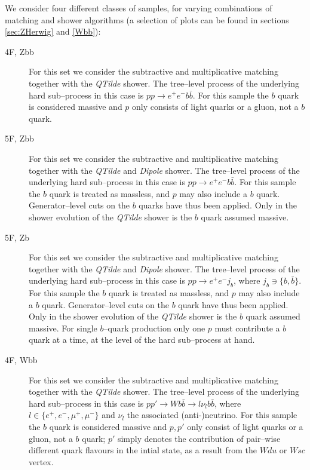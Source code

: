 \documentclass[11pt]{cernrep}
\begin{document}
We consider four different classes of samples, for varying combinations of
matching and shower algorithms (a selection of plots can be found in sections
\ref{sec:ZHerwig} and \ref{Wbb}):
\begin{description}
\item[4F, Zbb] For this set we consider the subtractive and multiplicative
  matching together with the \textit{QTilde} shower. The tree--level process of
  the underlying hard sub--process in this case is
  $pp \to e^+ e^- b\bar{b}$. For this sample the $b$ quark is
  considered massive and $p$ only consists of light quarks or a gluon, not a $b$
  quark.
\item[5F, Zbb] For this set we consider the subtractive and multiplicative
  matching together with the \textit{QTilde} and \textit{Dipole} shower. The
  tree--level process of the underlying hard sub--process in this case is
  $pp \to e^+ e^- b\bar{b}$. For this sample the $b$ quark is
  treated as massless, and $p$ may also include a $b$ quark. Generator--level
  cuts on the $b$ quarks have thus been applied. Only in the shower evolution of
  the \textit{QTilde} shower is the $b$ quark assumed massive.
\item[5F, Zb] For this set we consider the subtractive and multiplicative
  matching together with the \textit{QTilde} and \textit{Dipole} shower. The
  tree--level process of the underlying hard sub--process in this case is
  $pp \to e^+ e^- j_b$, where $j_b\ni\{b,\bar{b}\}$. For this sample
  the $b$ quark is treated as massless, and $p$ may also include a $b$ quark.
  Generator--level cuts on the $b$ quark have thus been applied. Only in the
  shower evolution of the \textit{QTilde} shower is the $b$ quark assumed
  massive. For single $b$--quark production only one $p$ must contribute a $b$
  quark at a time, at the level of the hard sub--process at hand.
\item[4F, Wbb] For this set we consider the subtractive and multiplicative
  matching together with the \textit{QTilde} shower. The tree--level process of
  the underlying hard sub--process in this case is
  $pp' \to W b\bar{b} \to l \nu_l b\bar{b}$, where
  $l \in \{e^+, e^-, \mu^+, \mu^-\}$ and $\nu_l$ the associated (anti-)neutrino.
  For this sample the $b$ quark is considered massive and $p,p'$ only consist of
  light quarks or a gluon, not a $b$ quark; $p'$ simply denotes the contribution
  of pair--wise different quark flavours in the intial state, as a result from
  the $Wdu$ or $Wsc$ vertex.
\end{description}
\end{document}
